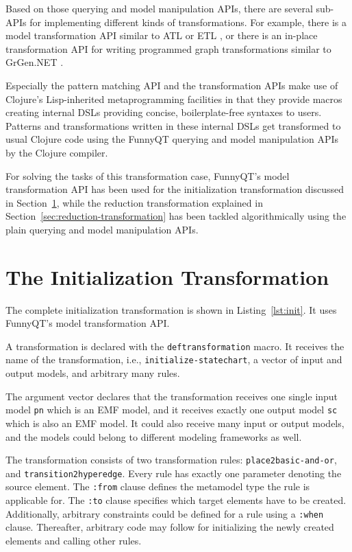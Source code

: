\documentclass[11pt]{article}
\begin{document}
Based on those querying and model manipulation APIs, there are several sub-APIs
for implementing different kinds of transformations.  For example, there is a
model transformation API similar to ATL \cite{ATL05} or ETL
\cite{booklet:epsilon}, or there is an in-place transformation API for writing
programmed graph transformations similar to GrGen.NET
\cite{manual:GrGenManual}.

Especially the pattern matching API and the transformation APIs make use of
Clojure's Lisp-inherited metaprogramming facilities
\cite{Graham1993OnLisp,Hoyte08LoL} in that they provide macros creating
internal DSLs \cite{book:Fowler2010DSL} providing concise, boilerplate-free
syntaxes to users.  Patterns and transformations written in these internal DSLs
get transformed to usual Clojure code using the FunnyQT querying and model
manipulation APIs by the Clojure compiler.

For solving the tasks of this transformation case, FunnyQT's model
transformation API has been used for the initialization transformation
discussed in Section~\ref{sec:init-transformation}, while the reduction
transformation explained in Section~\ref{sec:reduction-transformation} has been
tackled algorithmically using the plain querying and model manipulation APIs.


\section{The Initialization Transformation}
\label{sec:init-transformation}

The complete initialization transformation is shown in Listing~\ref{lst:init}.
It uses FunnyQT's model transformation API.

A transformation is declared with the \verb|deftransformation| macro.  It
receives the name of the transformation, i.e., \verb|initialize-statechart|, a
vector of input and output models, and arbitrary many rules.

The argument vector declares that the transformation receives one single input
model \verb|pn| which is an EMF model, and it receives exactly one output model
\verb|sc| which is also an EMF model.  It could also receive many input or
output models, and the models could belong to different modeling frameworks as
well.

\begin{sloppypar}
  The transformation consists of two transformation rules:
  \verb|place2basic-and-or|, and \verb|transition2hyperedge|.  Every rule has
  exactly one parameter denoting the source element.  The \verb|:from| clause
  defines the metamodel type the rule is applicable for.  The \verb|:to| clause
  specifies which target elements have to be created.  Additionally, arbitrary
  constraints could be defined for a rule using a \verb|:when| clause.
  Thereafter, arbitrary code may follow for initializing the newly created
  elements and calling other rules.
\end{sloppypar}
\end{document}
